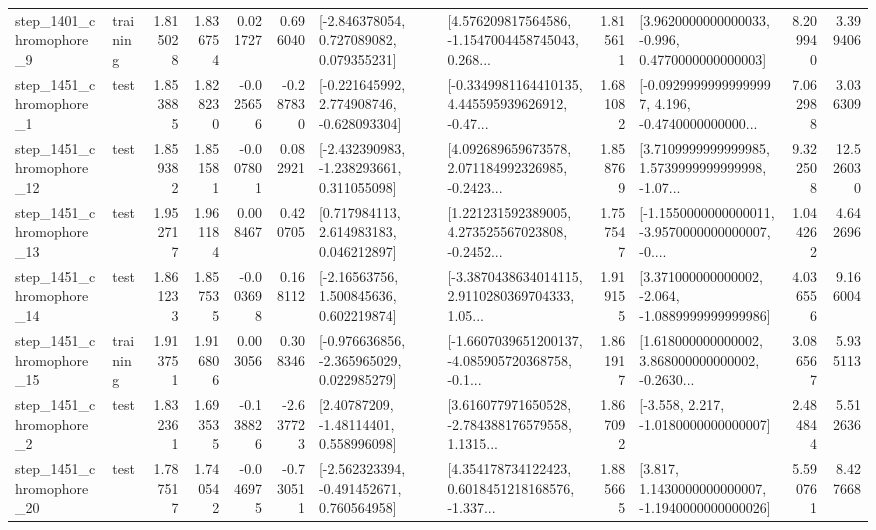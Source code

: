 \begin{tabular}{llrrrrllrlrr}
  step\_1401\_chromophore\_9 &  training &      1.815028 &    1.836754 &      0.021727 &  0.696040 &    [-2.846378054, 0.727089082, 0.079355231] &  [4.576209817564586, -1.1547004458745043, 0.268... &       1.815611 &   [3.9620000000000033, -0.996, 0.4770000000000003] &            8.209940 &          3.399406 \\
  step\_1451\_chromophore\_1 &      test &      1.853885 &    1.828230 &     -0.025656 & -0.287830 &   [-0.221645992, 2.774908746, -0.628093304] &  [-0.3349981164410135, 4.445595939626912, -0.47... &       1.681082 &  [-0.09299999999999997, 4.196, -0.4740000000000... &            7.062988 &          3.036309 \\
 step\_1451\_chromophore\_12 &      test &      1.859382 &    1.851581 &     -0.007801 &  0.082921 &   [-2.432390983, -1.238293661, 0.311055098] &  [4.092689659673578, 2.071184992326985, -0.2423... &       1.858769 &  [3.7109999999999985, 1.5739999999999998, -1.07... &            9.322508 &         12.526030 \\
 step\_1451\_chromophore\_13 &      test &      1.952717 &    1.961184 &      0.008467 &  0.420705 &     [0.717984113, 2.614983183, 0.046212897] &  [1.221231592389005, 4.273525567023808, -0.2452... &       1.757547 &  [-1.1550000000000011, -3.9570000000000007, -0.... &            1.044262 &          4.642696 \\
 step\_1451\_chromophore\_14 &      test &      1.861233 &    1.857535 &     -0.003698 &  0.168112 &     [-2.16563756, 1.500845636, 0.602219874] &  [-3.3870438634014115, 2.9110280369704333, 1.05... &       1.919155 &   [3.371000000000002, -2.064, -1.0889999999999986] &            4.036556 &          9.166004 \\
 step\_1451\_chromophore\_15 &  training &      1.913751 &    1.916806 &      0.003056 &  0.308346 &   [-0.976636856, -2.365965029, 0.022985279] &  [-1.6607039651200137, -4.085905720368758, -0.1... &       1.861917 &  [1.618000000000002, 3.868000000000002, -0.2630... &            3.086567 &          5.935113 \\
  step\_1451\_chromophore\_2 &      test &      1.832361 &    1.693535 &     -0.138826 & -2.637723 &      [2.40787209, -1.48114401, 0.558996098] &  [3.616077971650528, -2.784388176579558, 1.1315... &       1.867092 &               [-3.558, 2.217, -1.0180000000000007] &            2.484844 &          5.512636 \\
 step\_1451\_chromophore\_20 &      test &      1.787517 &    1.740542 &     -0.046975 & -0.730511 &   [-2.562323394, -0.491452671, 0.760564958] &  [4.354178734122423, 0.6018451218168576, -1.337... &       1.885665 &   [3.817, 1.1430000000000007, -1.1940000000000026] &            5.590761 &          8.427668 \\

\end{tabular}

